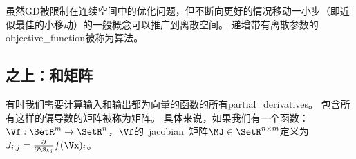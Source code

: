 
虽然\gls{GD}被限制在连续空间中的优化问题，但不断向更好的情况移动一小步（即近似最佳的小移动）的一般概念可以推广到离散空间。
递增带有离散参数的\gls{objective_function}被称为算法\citep{Russel+Norvig-book2003}。

\subsection{之上：和矩阵}
\label{sec:beyond_the_gradient_jacobian_and_hessian_matrices}
有时我们需要计算输入和输出都为向量的函数的所有\gls{partial_derivatives}。
包含所有这样的偏导数的矩阵被称为矩阵。
具体来说，如果我们有一个函数：$\Vf: \SetR^m \rightarrow \SetR^n$，$\Vf$的~\gls{jacobian}~矩阵$\MJ \in \SetR^{n \times m}$定义为$J_{i,j} = \frac{\partial}{\partial \Sx_j} f(\Vx)_i$。

